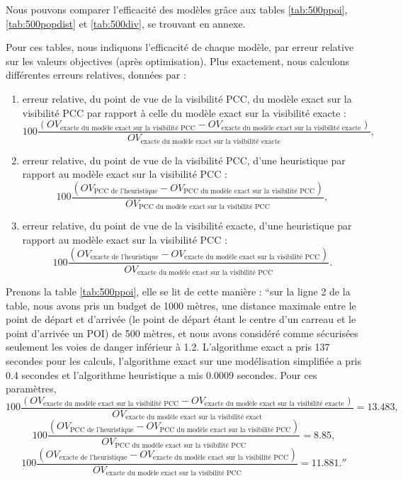 Nous pouvons comparer l'efficacité des modèles grâce aux tables \ref{tab:500ppoi}, \ref{tab:500popdist} et \ref{tab:500div}, se trouvant en annexe.

Pour ces tables, nous indiquons l'efficacité de chaque modèle, par erreur relative \cite{erreur_relative} sur les valeurs objectives (après optimisation). Plus exactement, nous calculons différentes erreurs relatives, données par :

\begin{enumerate}\label{enum:err}
    \item erreur relative, du point de vue de la visibilité PCC, du modèle exact sur la visibilité PCC par rapport à celle du modèle exact sur la visibilité exacte : $$100 \dfrac{(OV_{\text{exacte du modèle exact sur la visibilité PCC}} - OV_{\text{exacte du modèle exact sur la visibilité exacte}})}{OV_{\text{exacte du modèle exact sur la visibilité exacte}}},$$
    \item erreur relative, du point de vue de la visibilité PCC, d'une heuristique par rapport au modèle exact sur la visibilité PCC : $$100 \dfrac{(OV_{\text{PCC de l'heuristique}} - OV_{\text{PCC du modèle exact sur la visibilité PCC}})}{OV_{\text{PCC du modèle exact sur la visibilité PCC}}},$$
    \item erreur relative, du point de vue de la visibilité exacte, d'une heuristique par rapport au modèle exact sur la visibilité PCC : $$100 \dfrac{(OV_{\text{exacte de l'heuristique}} - OV_{\text{exacte du modèle exact sur la visibilité PCC}})}{OV_{\text{exacte du modèle exact sur la visibilité PCC}}}.$$
\end{enumerate}

Prenons la table \ref{tab:500ppoi}, elle se lit de cette manière : ``sur la ligne 2 de la table, nous avons pris un budget de 1000 mètres, une distance maximale entre le point de départ et d'arrivée (le point de départ étant le centre d'un carreau et le point d'arrivée un POI) de 500 mètres, et nous avons considéré comme sécurisées seulement les voies de danger inférieur à 1.2. L'algorithme exact a pris 137 secondes pour les calculs, l'algorithme exact sur une modélisation simplifiée a pris 0.4 secondes et l'algorithme heuristique a mis 0.0009 secondes. Pour ces paramètres, $$100 \dfrac{(OV_{\text{exacte du modèle exact sur la visibilité PCC}} - OV_{\text{exacte du modèle exact sur la visibilité exacte}})}{OV_{\text{exacte du modèle exact sur la visibilité exact}}}=13.483,$$
$$100 \dfrac{(OV_{\text{PCC de l'heuristique}} - OV_{\text{PCC du modèle exact sur la visibilité PCC}})}{OV_{\text{PCC du modèle exact sur la visibilité PCC}}}=8.85,$$
$$100 \dfrac{(OV_{\text{exacte de l'heuristique}} - OV_{\text{exacte du modèle exact sur la visibilité PCC}})}{OV_{\text{exacte du modèle exact sur la visibilité PCC}}}=11.881.''$$

